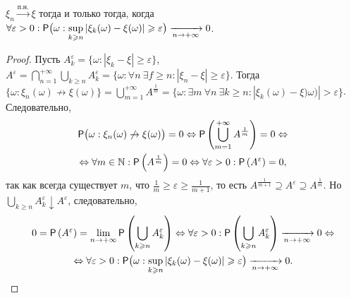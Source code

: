  \begin{lemma}
 	$\xi_n \xrightarrow{\text{п.н.}} \xi$ тогда и только тогда, когда $\forall \varepsilon > 0: \mathsf{P} \big(\omega: \sup\limits_{k \geqslant n} | \xi_k(\omega) - \xi(\omega) | \geqslant \varepsilon \big) \xrightarrow[n \rightarrow + \infty]{} 0$.
 	\begin{proof}
 		Пусть $A_k^\varepsilon = \big\{ \omega: | \xi_k - \xi | \geqslant \varepsilon \big\}$, $A^\varepsilon = \bigcap\limits_{n=1}^{+\infty} \bigcup\limits_{k \geqslant n} A_k^\varepsilon = \big\{\omega: \forall n~ \exists f \geqslant n: |\xi_n - \xi| \geqslant \varepsilon \big\}$. Тогда $\big\{ \omega: \xi_n (\omega) \not\rightarrow \xi(\omega) \big\} = \bigcup\limits_{m=1}^{+\infty} A^{\frac{1}{m}} = \big\{\omega: \exists m~ \forall n~ \exists k \geqslant n: | \xi_k(\omega) - \xi)\omega) | > \varepsilon \big\}$. Следовательно, 
 		\begin{multline*}
 			\mathsf{P} \big( \omega: \xi_n(\omega) \not\rightarrow \xi(\omega) \big) = 0 \Leftrightarrow \mathsf{P} \left( \bigcup\limits_{m = 1}^{+\infty} A^{\frac{1}{m}} \right) = 0 \Leftrightarrow \\ \Leftrightarrow \forall m \in \mathbb{N} : \mathsf{P} \left( A^{\frac{1}{m}} \right) = 0  \Leftrightarrow \forall \varepsilon > 0 : \mathsf{P}  \left( A^\varepsilon \right) = 0,
 		\end{multline*}
 		так как всегда существует $m$, что $\frac{1}{m} \geqslant \varepsilon \geqslant \frac{1}{m+1}$, то есть $A^{\frac{1}{m+1}} \supseteq A^\varepsilon \supseteq A^{\frac{1}{m}}$. Но $\bigcup\limits_{k \geqslant n} A^\varepsilon_k \downarrow A^\varepsilon$, следовательно, 
 		\begin{multline*}
 			0 = \mathsf{P} \left( A^\varepsilon \right) = 
 			\lim\limits_{n \rightarrow + \infty} \mathsf{P} \left( \bigcup_{k \geqslant n} A^\varepsilon_k \right) \Leftrightarrow
 			\forall \varepsilon > 0 : \mathsf{P} \left( \bigcup\limits_{k \geqslant n} A^\varepsilon_k \right) \xrightarrow[n \rightarrow + \infty]{} 0 \Leftrightarrow \\ 
 			\Leftrightarrow  \forall \varepsilon > 0:  \mathsf{P} \big(\omega: \sup\limits_{k \geqslant n} | \xi_k(\omega) - \xi(\omega) | \geqslant \varepsilon \big) \xrightarrow[n \rightarrow + \infty]{} 0.
 		\end{multline*}
 	\end{proof}
 \end{lemma}
